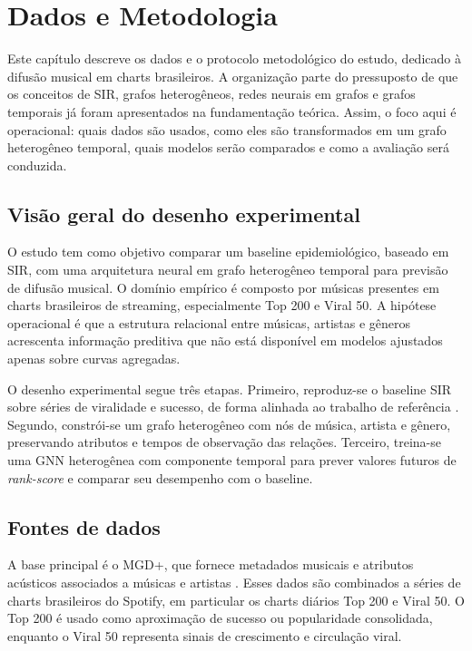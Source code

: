 \chapter{Dados e Metodologia}
\label{cap:metodologia}

Este capítulo descreve os dados e o protocolo metodológico do estudo, dedicado à difusão musical em charts brasileiros. A organização parte do pressuposto de que os conceitos de SIR, grafos heterogêneos, redes neurais em grafos e grafos temporais já foram apresentados na fundamentação teórica. Assim, o foco aqui é operacional: quais dados são usados, como eles são transformados em um grafo heterogêneo temporal, quais modelos serão comparados e como a avaliação será conduzida.


\section{Visão geral do desenho experimental}

O estudo tem como objetivo comparar um baseline epidemiológico, baseado em SIR, com uma arquitetura neural em grafo heterogêneo temporal para previsão de difusão musical. O domínio empírico é composto por músicas presentes em charts brasileiros de streaming, especialmente Top 200 e Viral 50. A hipótese operacional é que a estrutura relacional entre músicas, artistas e gêneros acrescenta informação preditiva que não está disponível em modelos ajustados apenas sobre curvas agregadas.

O desenho experimental segue três etapas. Primeiro, reproduz-se o baseline SIR sobre séries de viralidade e sucesso, de forma alinhada ao trabalho de referência \citep{oliveira2025brasnam}. Segundo, constrói-se um grafo heterogêneo com nós de música, artista e gênero, preservando atributos e tempos de observação das relações. Terceiro, treina-se uma GNN heterogênea com componente temporal para prever valores futuros de \emph{rank-score} e comparar seu desempenho com o baseline.


\section{Fontes de dados}

A base principal é o MGD+, que fornece metadados musicais e atributos acústicos associados a músicas e artistas \citep{seufitelli2023dsw}. Esses dados são combinados a séries de charts brasileiros do Spotify, em particular os charts diários Top 200 e Viral 50. O Top 200 é usado como aproximação de sucesso ou popularidade consolidada, enquanto o Viral 50 representa sinais de crescimento e circulação viral.

